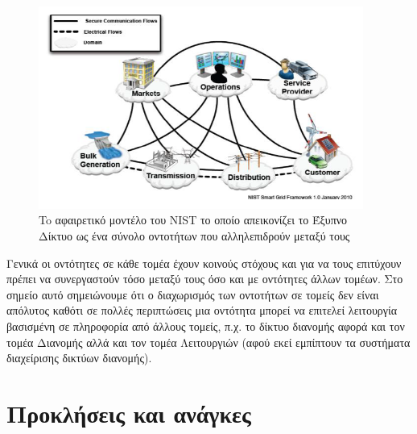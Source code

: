 \documentclass[12pt, a4paper, oneside]{report}
\begin{document}
\begin{figure}[!h]
\centering
\includegraphics[width=0.95\textwidth]{eikona_000}
\caption[To αφαιρετικό μοντέλο του NIST]{To αφαιρετικό μοντέλο του NIST το οποίο απεικονίζει το Έξυπνο Δίκτυο ως ένα σύνολο οντοτήτων που αλληλεπιδρούν μεταξύ τους\cite{21}}\label{eik00}
\end{figure}

Γενικά οι οντότητες σε κάθε τομέα έχουν κοινούς στόχους και για να τους επιτύχουν πρέπει να συνεργαστούν τόσο μεταξύ τους όσο και με οντότητες άλλων τομέων. Στο σημείο αυτό σημειώνουμε ότι ο διαχωρισμός των οντοτήτων σε τομείς δεν είναι απόλυτος καθότι σε πολλές περιπτώσεις μια οντότητα μπορεί να επιτελεί λειτουργία βασισμένη σε πληροφορία από άλλους τομείς, π.χ. το δίκτυο διανομής αφορά και τον τομέα Διανομής αλλά και τον τομέα Λειτουργιών (αφού εκεί εμπίπτουν τα συστήματα διαχείρισης δικτύων διανομής).
\section{Προκλήσεις και ανάγκες}
\end{document}
